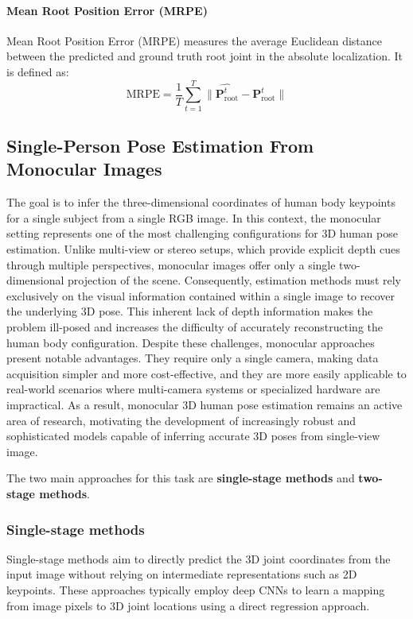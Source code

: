\paragraph{Mean Root Position Error (MRPE)}
Mean Root Position Error (MRPE) measures the average Euclidean distance between the predicted and ground truth root joint in the absolute localization. It is defined as:
\begin{equation}
    \text{MRPE} = \frac{1}{T} \sum_{t=1}^{T} \| \hat{\mathbf{P}_{\text{root}}^t} - \mathbf{P}_{\text{root}}^t \|
\end{equation}


\subsection{Single-Person Pose Estimation From Monocular Images}
The goal is to infer the three-dimensional coordinates of human body keypoints for a single subject from a single RGB image. In this context, the monocular setting represents one of the most challenging configurations for 3D human
pose estimation. Unlike multi-view or stereo setups, which provide explicit depth cues through multiple perspectives, monocular images offer only a single two-dimensional projection of the scene. Consequently, estimation methods must 
rely exclusively on the visual information contained within a single image to recover the underlying 3D pose. This inherent lack of depth information makes the problem ill-posed and increases the difficulty of accurately reconstructing 
the human body configuration. Despite these challenges, monocular approaches present notable advantages. They require only a single camera, making data acquisition simpler and more cost-effective, and they are more easily applicable 
to real-world scenarios where multi-camera systems or specialized hardware are impractical. As a result, monocular 3D human pose estimation remains an active area of research, motivating the development of increasingly robust and 
sophisticated models capable of inferring accurate 3D poses from single-view image.

The two main approaches for this task are \textbf{single-stage methods} and \textbf{two-stage methods}.

\subsubsection{Single-stage methods}
Single-stage methods aim to directly predict the 3D joint coordinates from the input image without relying on intermediate representations such as 2D keypoints. These approaches typically employ deep CNNs
to learn a mapping from image pixels to 3D joint locations using a direct regression approach.

